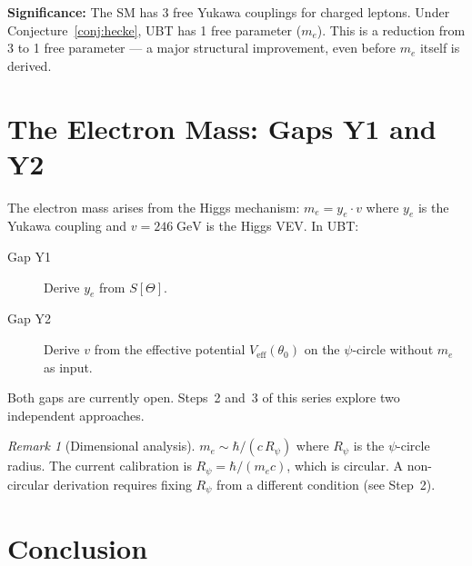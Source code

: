 \documentclass[12pt,a4paper]{article}
\theoremstyle{definition}
\theoremstyle{remark}
\newtheorem{remark}[theorem]{Remark}
\begin{document}
\begin{insightbox}
\textbf{Significance:}
The SM has 3 free Yukawa couplings for charged leptons.
Under Conjecture~\ref{conj:hecke}, UBT has 1 free parameter ($m_e$).
This is a reduction from 3 to 1 free parameter --- a major structural
improvement, even before $m_e$ itself is derived.
\end{insightbox}

\section{The Electron Mass: Gaps Y1 and Y2}
\label{sec:gaps}

The electron mass arises from the Higgs mechanism: $m_e = y_e \cdot v$
where $y_e$ is the Yukawa coupling and $v = 246\;\mathrm{GeV}$ is the
Higgs VEV.  In UBT:

\begin{description}
  \item[Gap Y1] Derive $y_e$ from $S[\Theta]$.
  \item[Gap Y2] Derive $v$ from the effective potential $V_{\mathrm{eff}}(\theta_0)$
                on the $\psi$-circle without $m_e$ as input.
\end{description}

Both gaps are currently open.  Steps~2 and~3 of this series explore two
independent approaches.

\begin{remark}[Dimensional analysis]
$m_e \sim \hbar/(c\,R_\psi)$ where $R_\psi$ is the $\psi$-circle radius.
The current calibration is $R_\psi = \hbar/(m_e c)$, which is circular.
A non-circular derivation requires fixing $R_\psi$ from a different
condition (see Step~2).
\end{remark}

\section{Conclusion}
\label{sec:conclusion}
\end{document}
